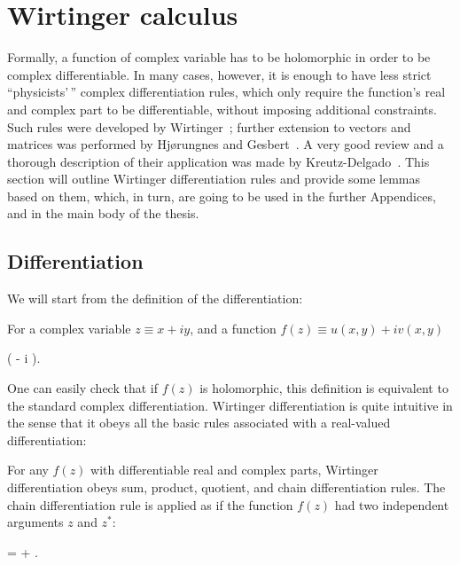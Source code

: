 \chapter{Wirtinger calculus}
\label{cha:appendix:c-numbers}

Formally, a function of complex variable has to be holomorphic in order to be complex differentiable.
In many cases, however, it is enough to have less strict ``physicists'\,'' complex differentiation rules, which only require the function's real and complex part to be differentiable, without imposing additional constraints.
Such rules were developed by Wirtinger~\cite{Wirtinger1927}; further extension to vectors and matrices was performed by Hj{\o}rungnes and Gesbert~\cite{Hjorungnes2007}.
A very good review and a thorough description of their application was made by Kreutz-Delgado~\cite{Kreutz-Delgado2009}.
This section will outline Wirtinger differentiation rules and provide some lemmas based on them, which, in turn, are going to be used in the further Appendices, and in the main body of the thesis.


\section{Differentiation}

We will start from the definition of the differentiation:

\begin{definition}
\label{def:c-numbers:wirtinger}
	For a complex variable $z \equiv x + iy$, and a function $f(z) \equiv u(x, y) + iv(x, y)$
	\begin{eqn*}
		\equiv {} \left(
			 - i 
		\right).
	\end{eqn*}
\end{definition}

One can easily check that if $f(z)$ is holomorphic, this definition is equivalent to the standard complex differentiation.
Wirtinger differentiation is quite intuitive in the sense that it obeys all the basic rules associated with a real-valued differentiation:

\begin{theorem}
\label{thm:c-numbers:diff-properties}
	For any $f(z)$ with differentiable real and complex parts, Wirtinger differentiation obeys sum, product, quotient, and chain differentiation rules.
	The chain differentiation rule is applied as if the function $f(z)$ had two independent arguments $z$ and $z^*$:
	\begin{eqn*}
		\frac{\cwd f(g(z))}{\cwd z}
		=  \frac{\cwd g}{\cwd z}
			+  \frac{\cwd g^*}{\cwd z}.
	\end{eqn*}
\end{theorem}

